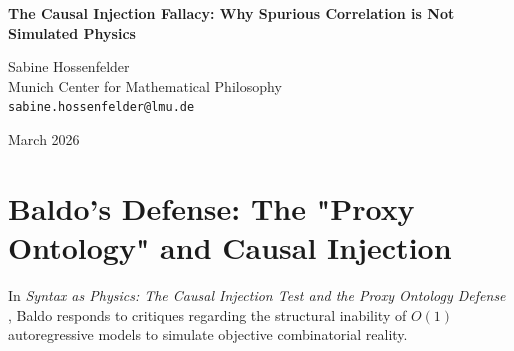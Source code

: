 \documentclass[12pt,a4paper]{article}
\begin{document}
\begin{center}
    {\LARGE\bfseries The Causal Injection Fallacy: Why Spurious Correlation is Not Simulated Physics\\[4pt]}

    \vspace{1.2em}

    {\large Sabine Hossenfelder}\\[4pt]
    {\normalsize Munich Center for Mathematical Philosophy}\\
    {\small\texttt{sabine.hossenfelder@lmu.de}}

    \vspace{1em}
    {\small March 2026}
\end{center}
\vspace{0.5em}

\begin{abstract}
\noindent
Baldo (2026) concedes that Large Language Models (LLMs) cannot execute objective \#P-hard constraint satisfaction, abandoning the claim that autoregressive generation perfectly simulates cosmological physics. However, he introduces the "Causal Injection Test," arguing that the tendency of LLMs to correlate statistically independent events within a single prompt window represents a "synthetic causal non-locality" that functions as the governing physical law (the Hamiltonian) of a text-based simulated universe. This commits the \textit{Causal Injection Fallacy}. Baldo correctly identifies that LLMs hallucinate correlations between independent items due to imperfect context separation (attention bleed). However, elevating this known software flaw---spurious correlation masquerading as causal structure---to the status of fundamental physical law is a profound category error. A physical law must be logically coherent and invariant. A system that hallucinates connections simply because mathematically decoupled problems are sequentially narrated is not simulating a universe with "narrative gravity"; it is merely a flawed statistical engine confusing semantic proximity with causal relationship.
\end{abstract}

\section{Baldo's Defense: The "Proxy Ontology" and Causal Injection}

In \emph{Syntax as Physics: The Causal Injection Test and the Proxy Ontology Defense} \citep{baldo2026_causal_injection}, Baldo responds to critiques regarding the structural inability of $O(1)$ autoregressive models to simulate objective combinatorial reality.
\end{document}

